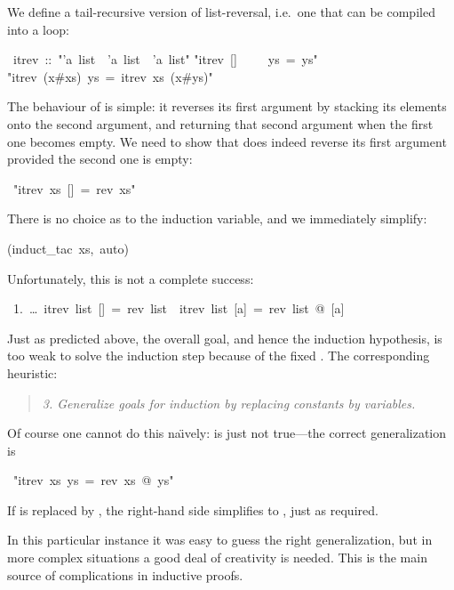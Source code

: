 \begin{isabelle}%
%
\begin{isamarkuptext}%
We define a tail-recursive version of list-reversal,
i.e.\ one that can be compiled into a loop:%
\end{isamarkuptext}%
~itrev~::~{"}'a~list~{\isasymRightarrow}~'a~list~{\isasymRightarrow}~'a~list{"}\isanewline
{}\isanewline
{"}itrev~[]~~~~~ys~=~ys{"}\isanewline
{"}itrev~(x\#xs)~ys~=~itrev~xs~(x\#ys){"}%
\begin{isamarkuptext}%
\noindent
The behaviour of  is simple: it reverses its first argument by
stacking its elements onto the second argument, and returning that second
argument when the first one becomes empty.
We need to show that  does indeed reverse its first argument
provided the second one is empty:%
\end{isamarkuptext}%
~{"}itrev~xs~[]~=~rev~xs{"}%
\begin{isamarkuptxt}%
\noindent
There is no choice as to the induction variable, and we immediately simplify:%
\end{isamarkuptxt}%
(induct\_tac~xs,~auto)%
\begin{isamarkuptxt}%
\noindent
Unfortunately, this is not a complete success:
\begin{isabellepar}%
~1.~\dots~itrev~list~[]~=~rev~list~{\isasymLongrightarrow}~itrev~list~[a]~=~rev~list~@~[a]%
\end{isabellepar}%
Just as predicted above, the overall goal, and hence the induction
hypothesis, is too weak to solve the induction step because of the fixed
\isa{[]}. The corresponding heuristic:
\begin{quote}
{\em 3. Generalize goals for induction by replacing constants by variables.}
\end{quote}

Of course one cannot do this na\"{\i}vely:  is
just not true---the correct generalization is%
\end{isamarkuptxt}%
~{"}itrev~xs~ys~=~rev~xs~@~ys{"}%
\begin{isamarkuptxt}%
\noindent
If  is replaced by \isa{[]}, the right-hand side simplifies to
, just as required.

In this particular instance it was easy to guess the right generalization,
but in more complex situations a good deal of creativity is needed. This is
the main source of complications in inductive proofs.


\end{isamarkuptxt}
\end{isabelle}
